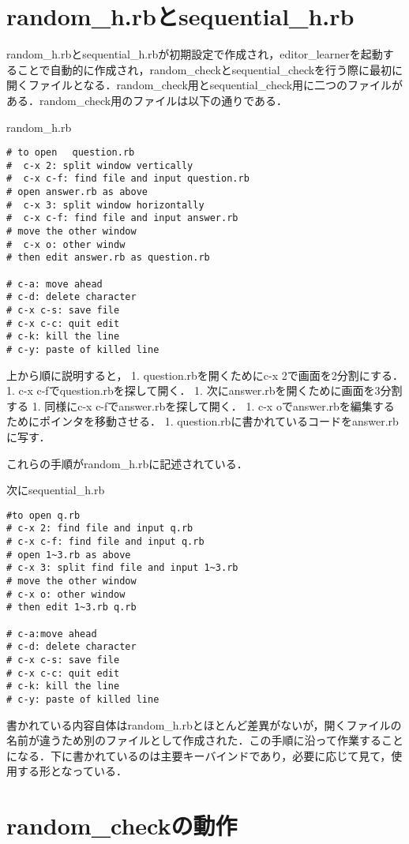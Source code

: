     \section{random\_h.rbとsequential\_h.rb}\label{random_h.rbux3068sequential_h.rb}

random\_h.rbとsequential\_h.rbが初期設定で作成され，editor\_learnerを起動することで自動的に作成され，random\_checkとsequential\_checkを行う際に最初に開くファイルとなる．random\_check用とsequential\_check用に二つのファイルがある．random\_check用のファイルは以下の通りである．

random\_h.rb

\begin{verbatim}
# to open 　question.rb
#  c-x 2: split window vertically
#  c-x c-f: find file and input question.rb
# open answer.rb as above
#  c-x 3: split window horizontally
#  c-x c-f: find file and input answer.rb
# move the other window
#  c-x o: other windw
# then edit answer.rb as question.rb

# c-a: move ahead
# c-d: delete character
# c-x c-s: save file
# c-x c-c: quit edit
# c-k: kill the line
# c-y: paste of killed line
\end{verbatim}

上から順に説明すると， 1. question.rbを開くためにc-x
2で画面を2分割にする． 1. c-x c-fでquestion.rbを探して開く． 1.
次にanswer.rbを開くために画面を3分割する 1. 同様にc-x
c-fでanswer.rbを探して開く． 1. c-x
oでanswer.rbを編集するためにポインタを移動させる． 1.
question.rbに書かれているコードをanswer.rbに写す．

これらの手順がrandom\_h.rbに記述されている．

次にsequential\_h.rb

\begin{verbatim}
#to open q.rb
# c-x 2: find file and input q.rb
# c-x c-f: find file and input q.rb
# open 1~3.rb as above
# c-x 3: split find file and input 1~3.rb
# move the other window
# c-x o: other window
# then edit 1~3.rb q.rb

# c-a:move ahead
# c-d: delete character
# c-x c-s: save file
# c-x c-c: quit edit
# c-k: kill the line
# c-y: paste of killed line
\end{verbatim}

書かれている内容自体はrandom\_h.rbとほとんど差異がないが，開くファイルの名前が違うため別のファイルとして作成された．この手順に沿って作業することになる．下に書かれているのは主要キーバインドであり，必要に応じて見て，使用する形となっている．

    \section{random\_checkの動作}\label{random_checkux306eux52d5ux4f5c}

